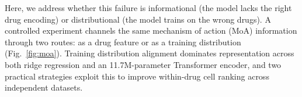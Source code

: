 Here, we address whether this failure is informational (the model lacks the right drug encoding) or distributional (the model trains on the wrong drugs). A controlled experiment channels the same mechanism of action (MoA) information through two routes: as a drug feature or as a training distribution (Fig.~\ref{fig:moa}). Training distribution alignment dominates representation across both ridge regression and an 11.7M-parameter Transformer encoder, and two practical strategies exploit this to improve within-drug cell ranking across independent datasets.